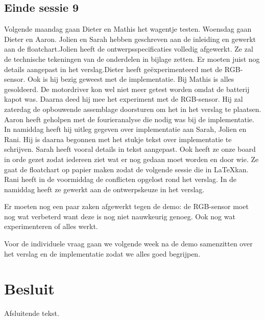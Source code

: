 \documentclass[a4paper,twoside,kulak]{kulakreport} %
\begin{document}
\section{Einde sessie 9}
Volgende maandag gaan Dieter en Mathis het wagentje testen. Woensdag gaan Dieter en Aaron. 
Jolien en Sarah hebben geschreven aan de inleiding en gewerkt aan de floatchart.Jolien heeft de ontwerpsspecificaties volledig afgewerkt. Ze zal de technische tekeningen van de onderdelen in bijlage zetten. Er moeten juist nog details aangepast in het  verslag.Dieter heeft geëxperimenteerd met de RGB-sensor. Ook is hij bezig geweest met de implementatie.
Bij Mathis is alles gesoldeerd. De motordriver kon wel niet meer getest worden omdat de batterij kapot was. Daarna deed hij mee het experiment met de RGB-sensor. Hij zal zaterdag de opbouwende assemblage doorsturen om het in het verslag te plaatsen. 
Aaron heeft geholpen met de fourieranalyse die nodig was bij de implementatie. In namiddag heeft hij uitleg gegeven over implementatie aan Sarah, Jolien en Rani. Hij is daarna begonnen met het stukje tekst over implementatie te schrijven.
Sarah heeft vooral details in tekst aangepast. Ook heeft ze onze board in orde gezet zodat iedereen ziet wat er nog gedaan moet worden en door wie. Ze gaat de floatchart op papier maken zodat de volgende sessie die in \LaTeX  kan. Rani heeft in de voormiddag de conflicten opgelost rond het verslag. In de namiddag heeft ze gewerkt aan de ontwerpskeuze in het verslag.

Er moeten nog een paar zaken afgewerkt tegen de demo:
de RGB-sensor moet nog wat verbeterd want deze is nog niet nauwkeurig genoeg. Ook nog wat experimenteren of alles werkt.


Voor de individuele vraag gaan we volgende week na de demo samenzitten over het verslag en de implementatie zodat we alles goed begrijpen.

\chapter*{Besluit}
Afsluitende tekst.
\end{document}
